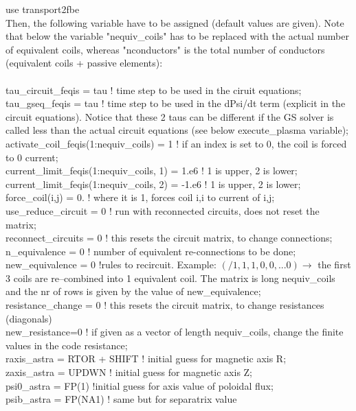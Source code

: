 \documentclass[12pt]{article}
\begin{document}
use transport2fbe\\
Then, the following variable have to be assigned (default values are given). Note that below the variable "nequiv\_coils" has to be replaced with the actual number of equivalent coils, whereas "nconductors" is the total number of conductors (equivalent coils + passive elements):\\\\
tau\_circuit\_feqis = tau ! time step to be used in the ciruit equations;\\
tau\_gseq\_feqis    = tau ! time step to be used in the dPsi/dt term (explicit in the circuit equations). Notice that these 2 taus can be different if the GS solver is called less than the actual circuit equations (see below execute\_plasma variable);\\
activate\_coil\_feqis(1:nequiv\_coils) = 1 ! if an index is set to 0, the coil is forced to 0 current; \\
current\_limit\_feqis(1:nequiv\_coils, 1) =  1.e6 ! 1 is upper, 2 is lower; \\
current\_limit\_feqis(1:nequiv\_coils, 2) = -1.e6 ! 1 is upper, 2 is lower; \\
force\_coil(i,j) = 0. ! where it is 1, forces coil i,i to current of i,j; \\
use\_reduce\_circuit = 0 ! run with reconnected circuits, does not reset the matrix; \\
reconnect\_circuits = 0 ! this resets the circuit matrix, to change connections; \\
n\_equivalence = 0 ! number of equivalent re-connections to be done;\\
new\_equivalence = 0 !rules to recircuit. Example: $(/1,1,1,0,0,...0) \rightarrow$ the first 3 coils are re--combined into 1 equivalent coil. The matrix is long nequiv\_coils and the nr of rows is given by the value of new\_equivalence; \\
resistance\_change = 0 ! this resets the circuit matrix, to change resistances (diagonals) \\
new\_resistance=0 ! if given as a vector of length nequiv\_coils, change the finite values in the code resistance;\\
raxis\_astra = RTOR + SHIFT ! initial guess for magnetic axis R;\\
zaxis\_astra = UPDWN ! initial guess for magnetic axis Z;\\
psi0\_astra = FP(1)  !initial guess for axis value of poloidal flux;\\
psib\_astra = FP(NA1) ! same but for separatrix value\\
\end{document}
